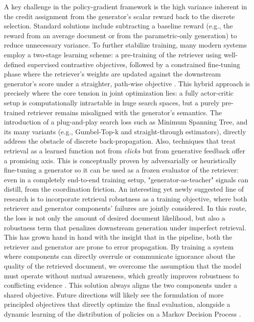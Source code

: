 \documentclass[11pt,a4paper]{article}
\begin{document}
A key challenge in the policy-gradient framework is the high variance inherent in the credit assignment from the generator's scalar reward back to the discrete selection. Standard solutions include subtracting a baseline reward (e.g., the reward from an average document or from the parametric-only generation) to reduce unnecessary variance. To further stabilize training, many modern systems employ a two-stage learning scheme: a pre-training of the retriever using well-defined supervised contrastive objectives, followed by a constrained fine-tuning phase where the retriever's weights are updated against the downstream generator's score under a straighter, path-wise objective \cite{arxiv:2005.11401v4}. This hybrid approach is precisely where the core tension in joint optimization lies: a fully actor-critic setup is computationally intractable in huge search spaces, but a purely pre-trained retriever remains misaligned with the generator's semantics. The introduction of a plug-and-play search loss such as Minimum Spanning Tree, and its many variants (e.g., Gumbel-Top-k and straight-through estimators), directly address the obstacle of discrete back-propagation. Also, techniques that treat retrieval as a learned function not from \emph{clicks} but from generative feedback offer a promising axis. This is conceptually proven by adversarially or heuristically fine-tuning a generator so it can be used as a frozen evaluator of the retriever: even in a completely end-to-end training setup, "generator-as-teacher" signals can distill, from the coordination friction. An interesting yet newly suggested line of research is to incorporate retrieval robustness as a training objective, where both retriever and generator components' failures are jointly considered. In this route, the loss is not only the amount of desired document likelihood, but also a robustness term that penalizes downstream generation under imperfect retrieval. This has grown hand in hand with the insight that in the pipeline, both the retriever and generator are prone to error propagation. By training a system where components can directly overrule or communicate ignorance about the quality of the retrieved document, we overcome the assumption that the model must operate without mutual awareness, which greatly improves robustness to conflicting evidence \cite{arxiv:2410.07176v2}. This solution always aligns the two components under a shared objective. Future directions will likely see the formulation of more principled objectives that directly optimize the final evaluation, alongside a dynamic learning of the distribution of policies on a Markov Decision Process \cite{arxiv:2502.01142v2}.
\end{document}

